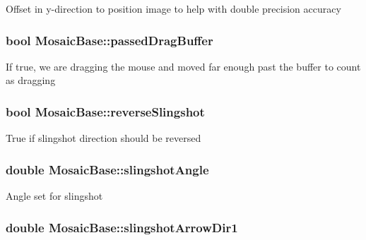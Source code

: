 \label{class_mosaic_base_a7f85154572a64ea2b945d9582a002720}
Offset in y-\/direction to position image to help with double precision accuracy \hypertarget{class_mosaic_base_aa38a3dd84d23829c9aa818d117b75d80}{
\subsubsection[{passedDragBuffer}]{\setlength{\rightskip}{0pt plus 5cm}bool {\bf MosaicBase::passedDragBuffer}}}
\label{class_mosaic_base_aa38a3dd84d23829c9aa818d117b75d80}
If true, we are dragging the mouse and moved far enough past the buffer to count as dragging \hypertarget{class_mosaic_base_a04340d5d715dd9a4f8eabe65c8c728cd}{
\subsubsection[{reverseSlingshot}]{\setlength{\rightskip}{0pt plus 5cm}bool {\bf MosaicBase::reverseSlingshot}}}
\label{class_mosaic_base_a04340d5d715dd9a4f8eabe65c8c728cd}
True if slingshot direction should be reversed \hypertarget{class_mosaic_base_aef0ccb3e15d613168c83b7b36838ff43}{
\subsubsection[{slingshotAngle}]{\setlength{\rightskip}{0pt plus 5cm}double {\bf MosaicBase::slingshotAngle}}}
\label{class_mosaic_base_aef0ccb3e15d613168c83b7b36838ff43}
Angle set for slingshot \hypertarget{class_mosaic_base_a9b2306b8335a0b7528a32b6d85759e08}{
\subsubsection[{slingshotArrowDir1}]{\setlength{\rightskip}{0pt plus 5cm}double {\bf MosaicBase::slingshotArrowDir1}}}
